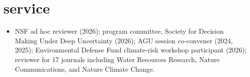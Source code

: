 \documentclass[10pt,oneside]{article}
\begin{document}
\section{service}

\mbox{}\vspace{-\dimexpr\baselineskip\relax}

\begin{itemize}[label={}]

\item NSF ad hoc reviewer (2026); program committee, Society for Decision Making Under Deep Uncertainty (2026); AGU session co-convener (2024, 2025); Environmental Defense Fund climate-risk workshop participant (2026); reviewer for 17 journals including Water Resources Research, Nature Communications, and Nature Climate Change.

\end{itemize}
\end{document}
